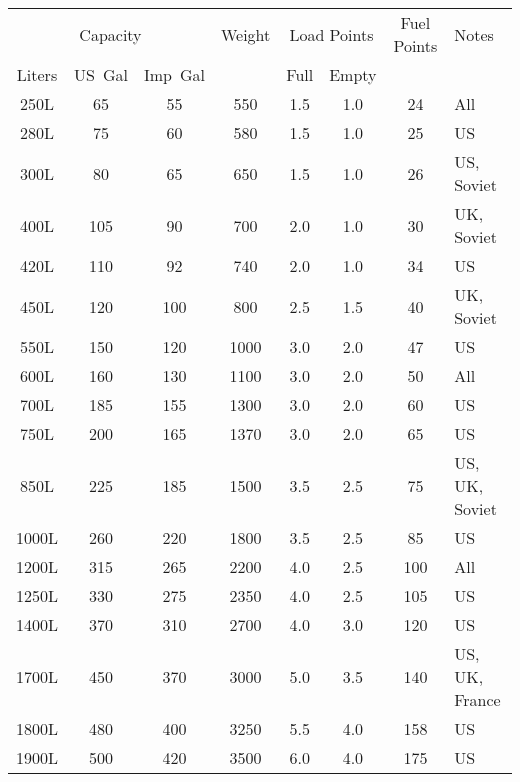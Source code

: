 \begin{twocolumntablefloat}
\begin{twocolumntable}
{
\begin{tabular}{cccccccl}
\toprule
\multicolumn{3}{c}{Capacity}&
Weight&
\multicolumn{2}{c}{Load Points}&
Fuel Points&
Notes\\
\cmidrule{1-3}
\cmidrule{5-6}
Liters&US~Gal&Imp~Gal&&Full&Empty&&\\
\midrule
\phantom{0}250L&\phantom{0}65&\phantom{0}55&\phantom{0}550&1.5&1.0&\phantom{0}24&All\\
\phantom{0}280L&\phantom{0}75&\phantom{0}60&\phantom{0}580&1.5&1.0&\phantom{0}25&US\\
\phantom{0}300L&\phantom{0}80&\phantom{0}65&\phantom{0}650&1.5&1.0&\phantom{0}26&US, Soviet\\
\phantom{0}400L&\phantom{}105&\phantom{0}90&\phantom{0}700&2.0&1.0&\phantom{0}30&UK, Soviet\\
\phantom{0}420L&\phantom{}110&\phantom{0}92&\phantom{0}740&2.0&1.0&\phantom{0}34&US\\
\phantom{0}450L&\phantom{}120&\phantom{}100&\phantom{0}800&2.5&1.5&\phantom{0}40&UK, Soviet\\
\phantom{0}550L&\phantom{}150&\phantom{}120&\phantom{}1000&3.0&2.0&\phantom{0}47&US\\
\phantom{0}600L&\phantom{}160&\phantom{}130&\phantom{}1100&3.0&2.0&\phantom{0}50&All\\
\phantom{0}700L&\phantom{}185&\phantom{}155&\phantom{}1300&3.0&2.0&\phantom{0}60&US\\
\phantom{0}750L&\phantom{}200&\phantom{}165&\phantom{}1370&3.0&2.0&\phantom{0}65&US\\
\phantom{0}850L&\phantom{}225&\phantom{}185&\phantom{}1500&3.5&2.5&\phantom{0}75&US, UK, Soviet\\
\phantom{}1000L&\phantom{}260&\phantom{}220&\phantom{}1800&3.5&2.5&\phantom{0}85&US\\
\phantom{}1200L&\phantom{}315&\phantom{}265&\phantom{}2200&4.0&2.5&\phantom{}100&All\\
\phantom{}1250L&\phantom{}330&\phantom{}275&\phantom{}2350&4.0&2.5&\phantom{}105&US\\
\phantom{}1400L&\phantom{}370&\phantom{}310&\phantom{}2700&4.0&3.0&\phantom{}120&US\\
\phantom{}1700L&\phantom{}450&\phantom{}370&\phantom{}3000&5.0&3.5&\phantom{}140&US, UK, France\\
\phantom{}1800L&\phantom{}480&\phantom{}400&\phantom{}3250&5.5&4.0&\phantom{}158&US\\
\phantom{}1900L&\phantom{}500&\phantom{}420&\phantom{}3500&6.0&4.0&\phantom{}175&US\\

\end{tabular}}
\end{twocolumntable}
\end{twocolumntablefloat}
